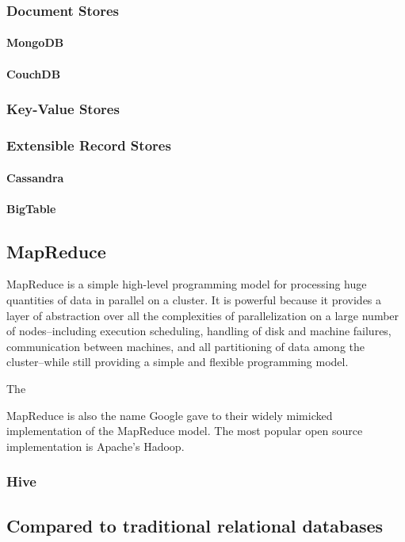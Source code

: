 \documentclass[11pt,a4paper]{report}
\begin{document}
\subsubsection*{Document Stores}
\paragraph*{MongoDB}
\paragraph*{CouchDB}
\subsubsection*{Key-Value Stores}
\subsubsection*{Extensible Record Stores}
\paragraph*{Cassandra}
\paragraph*{BigTable}

\subsection*{MapReduce}
MapReduce is a simple high-level programming model for processing huge quantities of data in parallel on a cluster. It is powerful because it provides a layer of abstraction over all the complexities of parallelization on a large number of nodes--including  execution scheduling, handling of disk and machine failures, communication between machines, and all partitioning of data among the cluster--while still providing a simple and flexible programming model.\cite{dean2008mapreduce}

The 

MapReduce is also the name Google gave to their widely mimicked implementation of the MapReduce model. The most popular open source implementation is Apache's Hadoop. 
\subsubsection*{Hive}

\subsection*{Compared to traditional relational databases}

\pagebreak


\end{document}
